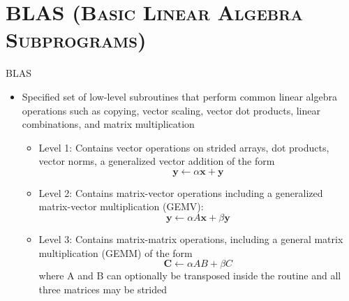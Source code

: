 \documentclass[xcolor=x11names,compress]{beamer}
\renewcommand{\(}{\begin{columns}}
\renewcommand{\)}{\end{columns}}
\newcommand{\<}[1]{\begin{column}{#1}}
\renewcommand{\>}{\end{column}}
\begin{document}
\section{\scshape BLAS (Basic Linear Algebra Subprograms) }
\begin{frame}[fragile]{BLAS}
\begin{scriptsize}\begin{itemize} 
 \item Specified set of low-level subroutines that perform common linear algebra operations such as copying, vector scaling, vector dot products, linear combinations, and matrix multiplication
 \begin{itemize}
 \item Level 1: Contains vector operations on strided arrays, dot products, vector norms, a generalized vector addition of the form
    \[\boldsymbol{y} \leftarrow \alpha \boldsymbol{x} + \boldsymbol{y} \]
 \item Level 2: Contains matrix-vector operations including a generalized matrix-vector multiplication (GEMV):
    \[\boldsymbol{y} \leftarrow \alpha A \boldsymbol{x} + \beta \boldsymbol{y} \]
 \item Level 3: Contains matrix-matrix operations, including a general matrix multiplication (GEMM) of the form
   \[\boldsymbol{C} \leftarrow \alpha A B + \beta C \]
where A and B can optionally be transposed inside the routine and all three matrices may be strided
\end{itemize}
\end{itemize}\end{scriptsize}
\end{frame}
\end{document}
